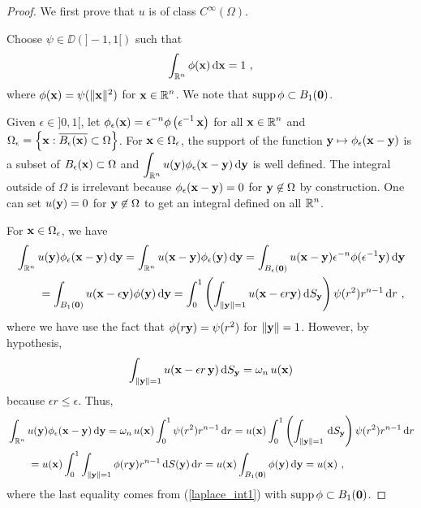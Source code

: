 \begin{proof}
 We first prove that $u$ is of class $C^\infty(\Omega)$.

Choose $\psi \in \DD(]-1,1[)$ such that
\begin{equation} \label{laplace_int1}
\int_{\mathbb{R}^n} \phi(\mathbf{x}) \,\mathrm{d}{\mathbf{x}} = 1 \ ,
\end{equation}
where $\phi(\mathbf{x}) = \psi(\|\mathbf{x}\|^2)$ for
$\displaystyle \mathbf{x} \in \mathbb{R}^n$.
We note that $\operatorname{supp} \phi \subset B_1(\mathbf{0})$.

Given $\epsilon \in ]0,1[$, let
$\displaystyle
\phi_\epsilon(\mathbf{x}) = \epsilon^{-n} \phi\left(\epsilon^{-1}\,\mathbf{x}\right)$
for all $\displaystyle \mathbf{x} \in \mathbb{R}^n$ and
$\displaystyle \Omega_\epsilon
= \left\{ \mathbf{x} : \overline{B_\epsilon(\mathbf{x})} \subset \Omega \right\}$.
For $\mathbf{x} \in \Omega_\epsilon$, the support of the function
$\mathbf{y} \mapsto \phi_\epsilon(\mathbf{x}-\mathbf{y})$ is a subset of
$B_\epsilon(\mathbf{x}) \subset \Omega$ and
$\displaystyle
\int_{\mathbb{R}^n} u(\mathbf{y}) \phi_\epsilon(\mathbf{x}-\mathbf{y}) \,\mathrm{d}{\mathbf{y}}$
is well defined.  The integral outside of $\Omega$ is irrelevant
because $\phi_\epsilon(\mathbf{x}-\mathbf{y}) = 0$ for
$\mathbf{y} \not\in \Omega$ by construction.  One can set $u(\mathbf{y})=0$
for $\mathbf{y} \not\in \Omega$ to get an integral defined on all
$\displaystyle \mathbb{R}^n$.

For $\mathbf{x} \in \Omega_\epsilon$, we have
\begin{align*}
&\int_{\mathbb{R}^n} u(\mathbf{y}) \phi_\epsilon(\mathbf{x}-\mathbf{y}) \,\mathrm{d}{\mathbf{y}} =
\int_{\mathbb{R}^n} u(\mathbf{x}-\mathbf{y}) \phi_\epsilon(\mathbf{y}) \,\mathrm{d}{\mathbf{y}}
=\int_{B_\epsilon(\mathbf{0})} u(\mathbf{x}-\mathbf{y})
\epsilon^{-n} \phi(\epsilon^{-1} \mathbf{y}) \,\mathrm{d}{\mathbf{y}} \\
&\qquad =\int_{B_1(\mathbf{0})} u(\mathbf{x}-\epsilon \mathbf{y})
\phi(\mathbf{y}) \,\mathrm{d}{\mathbf{y}}
=\int_0^1 \left(
\int_{\|\mathbf{y}\|=1} u(\mathbf{x}-\epsilon r \mathbf{y}) \,\mathrm{d}{S}_{\mathbf{y}} \right)
\psi(r^2) r^{n-1} \,\mathrm{d}{r} \ ,
\end{align*}
where we have use the fact that $\phi(r\mathbf{y}) = \psi(r^2)$ for
$\|\mathbf{y}\| = 1$.  However, by hypothesis,
\[
\int_{\|\mathbf{y}\|=1} u(\mathbf{x}-\epsilon r\, \mathbf{y}) \,\mathrm{d}{S}_{\mathbf{y}}
= \omega_n \, u(\mathbf{x})
\]
because $\epsilon r \leq \epsilon$.  Thus,
\begin{align*}
&\int_{\mathbb{R}^n} u(\mathbf{y}) \phi_\epsilon(\mathbf{x}-\mathbf{y}) \,\mathrm{d}{\mathbf{y}}
= \omega_n \, u(\mathbf{x}) \int_0^1 \psi(r^2) r^{n-1} \,\mathrm{d}{r}
= u(\mathbf{x}) \int_0^1 \left( \int_{\|\mathbf{y}\|=1} \,\mathrm{d}{S}_{\mathbf{y}}\right)
\psi(r^2) r^{n-1} \,\mathrm{d}{r} \\
&\qquad = u(\mathbf{x}) \int_0^1 \int_{\|\mathbf{y}\|=1} \phi(r\mathbf{y}) r^{n-1}
\,\mathrm{d}{S(\mathbf{y})} \,\mathrm{d}{r}
= u(\mathbf{x}) \int_{B_1(\mathbf{0})} \phi(\mathbf{y}) \,\mathrm{d}{\mathbf{y}} = u(\mathbf{x}) \ ,
\end{align*}
where the last equality comes from (\ref{laplace_int1}) with
$\operatorname{supp} \phi \subset B_1(\mathbf{0})$.


\end{proof}
